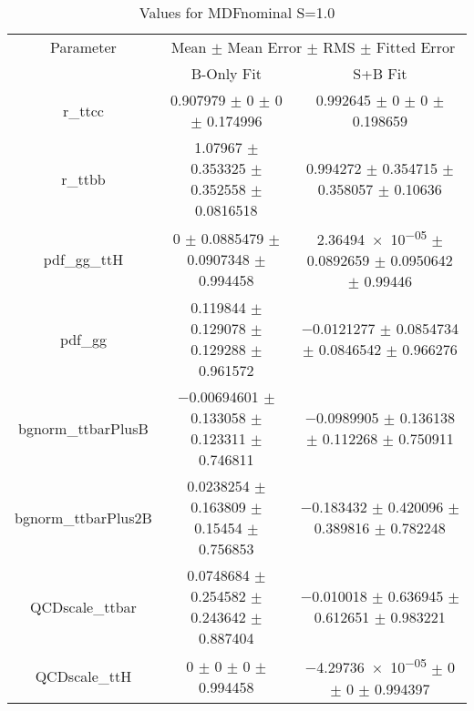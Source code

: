 \begin{table}
\centering
\caption{Values for MDFnominal S=1.0}
\begin{tabular}{ccc}
\toprule
Parameter & \multicolumn{2}{c}{Mean $\pm$ Mean Error $\pm$ RMS $\pm$ Fitted Error}\\
 & B-Only Fit & S+B Fit\\
\midrule
r\_ttcc & \num{0.907979} $\pm$ \num{0} $\pm$ \num{0} $\pm$ \num{0.174996} & \num{0.992645} $\pm$ \num{0} $\pm$ \num{0} $\pm$ \num{0.198659}\\
r\_ttbb & \num{1.07967} $\pm$ \num{0.353325} $\pm$ \num{0.352558} $\pm$ \num{0.0816518} & \num{0.994272} $\pm$ \num{0.354715} $\pm$ \num{0.358057} $\pm$ \num{0.10636}\\
pdf\_gg\_ttH & \num{0} $\pm$ \num{0.0885479} $\pm$ \num{0.0907348} $\pm$ \num{0.994458} & \num{2.36494e-05} $\pm$ \num{0.0892659} $\pm$ \num{0.0950642} $\pm$ \num{0.99446}\\
pdf\_gg & \num{0.119844} $\pm$ \num{0.129078} $\pm$ \num{0.129288} $\pm$ \num{0.961572} & \num{-0.0121277} $\pm$ \num{0.0854734} $\pm$ \num{0.0846542} $\pm$ \num{0.966276}\\
bgnorm\_ttbarPlusB & \num{-0.00694601} $\pm$ \num{0.133058} $\pm$ \num{0.123311} $\pm$ \num{0.746811} & \num{-0.0989905} $\pm$ \num{0.136138} $\pm$ \num{0.112268} $\pm$ \num{0.750911}\\
bgnorm\_ttbarPlus2B & \num{0.0238254} $\pm$ \num{0.163809} $\pm$ \num{0.15454} $\pm$ \num{0.756853} & \num{-0.183432} $\pm$ \num{0.420096} $\pm$ \num{0.389816} $\pm$ \num{0.782248}\\
QCDscale\_ttbar & \num{0.0748684} $\pm$ \num{0.254582} $\pm$ \num{0.243642} $\pm$ \num{0.887404} & \num{-0.010018} $\pm$ \num{0.636945} $\pm$ \num{0.612651} $\pm$ \num{0.983221}\\
QCDscale\_ttH & \num{0} $\pm$ \num{0} $\pm$ \num{0} $\pm$ \num{0.994458} & \num{-4.29736e-05} $\pm$ \num{0} $\pm$ \num{0} $\pm$ \num{0.994397}\\
\bottomrule
\end{tabular}
\end{table}